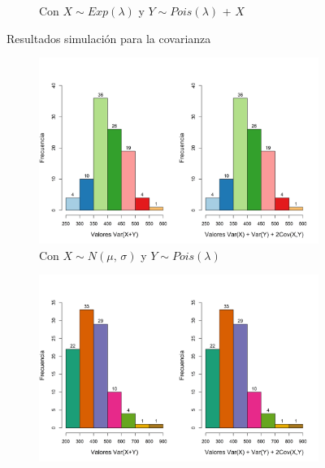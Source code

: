 \documentclass{article}
\begin{document}
\begin{figure}[h]
\begin{center}
\begin{subfigure}[b]{0.5\textwidth}
        \caption{Con $X \sim Exp(\lambda)$ y $Y \sim Pois(\lambda)$ + $X$}
        \label{resultadosValorEdep}
    \end{subfigure}
    \caption{Resultados simulación para la covarianza}
    \label{resultadosValorE}
    \end{center}
\end{figure}

\begin{figure}[h]
    \begin{center}
    \captionsetup{justification=centering}
    \begin{subfigure}[b]{0.5\textwidth}
        \includegraphics[scale=0.35]{Figures/var-norm-pois.png}
        \caption{Con $X \sim N(\mu, \, \sigma)$ y $Y \sim Pois(\lambda)$}
    \end{subfigure}
    \begin{subfigure}[b]{0.5\textwidth}
        \includegraphics[scale=0.35]{Figures/var-unif-exp.png}

\end{subfigure}
\end{center}
\end{figure}
\end{document}
